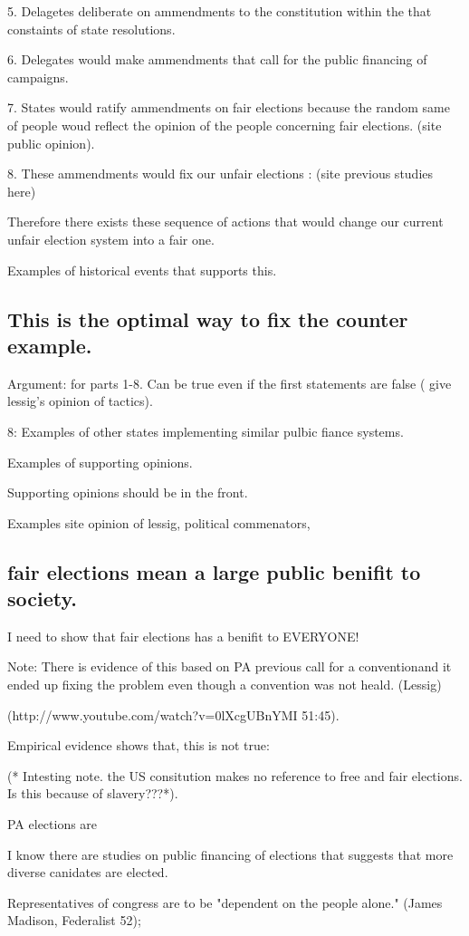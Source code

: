 \documentclass[11pt]{article} %
\begin{document}
\begin{enumerate}
5.  Delagetes deliberate on ammendments to the constitution within the that constaints of state resolutions.  

6. Delegates would make ammendments that call for the public financing of campaigns.

7.  States would ratify ammendments on fair elections because the random same of people woud reflect the opinion of the people concerning fair elections. (site public opinion).

8. These ammendments would fix our unfair elections : (site previous studies here)


Therefore there exists these sequence of actions that would change our current unfair election system into a fair one. 

Examples of historical events that supports this. 



\subsection{This is the optimal way to fix the counter example.}

Argument: for parts 1-8.  Can be true even if the first statements are false ( give lessig's opinion of tactics). 

8:  Examples of other states implementing similar pulbic fiance systems. 

Examples of supporting opinions.

Supporting opinions should be in the front. 

Examples site opinion of lessig, political commenators, 



\subsection{fair elections mean a large public benifit to society.}

I need to show that fair elections has a benifit to EVERYONE!






Note:  There is evidence of this based on PA previous call for a conventionand it ended up fixing the problem even though a convention was not heald. (Lessig)


(http://www.youtube.com/watch?v=0lXcgUBnYMI   51:45).



Empirical evidence shows that, this is not true:  

(* Intesting note.  the US consitution makes no reference to free and fair elections. Is this because of slavery???*). 

PA elections are 

I know there are studies on public financing of elections that suggests that more diverse canidates are elected. 

Representatives of congress are to be "dependent on the people alone." (James Madison, Federalist 52); 




\end{enumerate}
\end{document}

